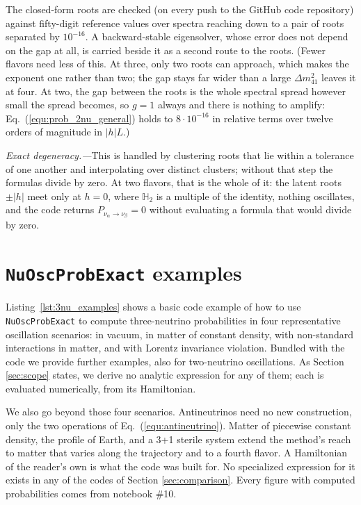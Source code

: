 \documentclass[final,5p,times,twocolumn,sort,compress]{elsarticle}
\newcommand{\eq}{Eq.}
\newcommand{\equ}[1]{\eq~(\ref{equ:#1})}
\begin{document}
The closed-form roots are checked (on every push to the GitHub code repository) against fifty-digit reference values over spectra reaching down to a pair of roots separated by $10^{-16}$.  A backward-stable eigensolver, whose error does not depend on the gap at all, is carried beside it as a second route to the roots.  (Fewer flavors need less of this.  At three, only two roots can approach, which makes the exponent one rather than two; the gap stays far wider than a large $\Delta m_{41}^2$ leaves it at four.  At two, the gap between the roots is the whole spectral spread however small the spread becomes, so $g = 1$ always and there is nothing to amplify: \equ{prob_2nu_general} holds to $8 \cdot 10^{-16}$ in relative terms over twelve orders of magnitude in $\lvert h \rvert L$.)

\smallskip

\textit{Exact degeneracy.---}This is handled by clustering roots that lie within a tolerance of one another and interpolating over distinct clusters; without that step the formulas divide by zero.  At two flavors, that is the whole of it: the latent roots $\pm \lvert h \rvert$ meet only at $h = 0$, where $\mathbb{H}_2$ is a multiple of the identity, nothing oscillates, and the code returns $P_{\nu_\alpha \to \nu_\beta} = 0$ without evaluating a formula that would divide by zero.


\section{{\tt NuOscProbExact} examples}
\label{sec:examples}

Listing\ \ref{lst:3nu_examples} shows a basic code example of how to use {\tt NuOscProbExact} to compute three-neutrino probabilities in four representative oscillation scenarios: in vacuum, in matter of constant density, with non-standard interactions in matter, and with Lorentz invariance violation.  Bundled with the code we provide further examples, also for two-neutrino oscillations.  As Section \ref{sec:scope} states, we derive no analytic expression for any of them; each is evaluated numerically, from its Hamiltonian.

We also go beyond those four scenarios.  Antineutrinos need no new construction, only the two operations of \equ{antineutrino}.  Matter of piecewise constant density, the profile of Earth, and a 3+1 sterile system extend the method's reach to matter that varies along the trajectory and to a fourth flavor.  A Hamiltonian of the reader's own is what the code was built for.  No specialized expression for it exists in any of the codes of Section \ref{sec:comparison}.  Every figure with computed probabilities comes from notebook \#10.
\end{document}
